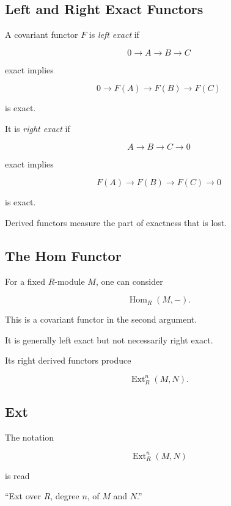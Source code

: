 \subsection{Left and Right Exact Functors}
\label{subsec:left-right-exact}

A covariant functor \(F\) is \emph{left exact} if

\[ 0\to A\to B\to C \]

exact implies

\[ 0\to F(A)\to F(B)\to F(C) \]

is exact.

It is \emph{right exact} if

\[ A\to B\to C\to0 \]

exact implies

\[ F(A)\to F(B)\to F(C)\to0 \]

is exact.

Derived functors measure the part of exactness that is lost.

\subsection{The Hom Functor}
\label{subsec:hom-functor-homological}

For a fixed \(R\)-module \(M\), one can consider

\[ \operatorname{Hom}_R(M,-). \]

This is a covariant functor in the second argument.

It is generally left exact but not necessarily right exact.

Its right derived functors produce

\[ \operatorname{Ext}_R^n(M,N). \]

\subsection{Ext}
\label{subsec:ext}

The notation

\[ \operatorname{Ext}_R^n(M,N) \]

is read

``Ext over \(R\), degree \(n\), of \(M\) and \(N\).''

